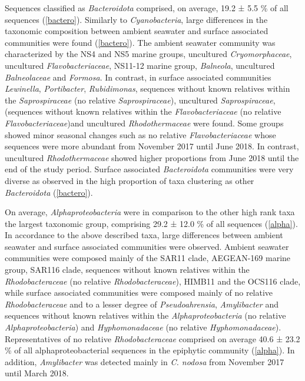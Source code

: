 \documentclass[12pt,]{article}
\begin{document}
Sequences classified as \emph{Bacteroidota} comprised, on average, 19.2
± 5.5 \si{\percent} of all sequences (\autoref{bactero}). Similarly to
\emph{Cyanobacteria}, large differences in the taxonomic composition
between ambient seawater and surface associated communities were found
(\autoref{bactero}). The ambient seawater community was characterized by
the NS4 and NS5 marine groups, uncultured \emph{Cryomorphaceae},
uncultured \emph{Flavobacteriaceae}, NS11-12 marine group,
\emph{Balneola}, uncultured \emph{Balneolaceae} and \emph{Formosa}. In
contrast, in surface associated communities \emph{Lewinella},
\emph{Portibacter}, \emph{Rubidimonas}, sequences without known
relatives within the \emph{Saprospiraceae} (no relative
\emph{Saprospiraceae}), uncultured \emph{Saprospiraceae}, (sequences
without known relatives within the \emph{Flavobacteriaceae} (no relative
\emph{Flavobacteriaceae})and uncultured \emph{Rhodothermaceae} were
found. Some groups showed minor seasonal changes such as no relative
\emph{Flavobacteriaceae} whose sequences were more abundant from
November 2017 until June 2018. In contrast, uncultured
\emph{Rhodothermaceae} showed higher proportions from June 2018 until
the end of the study period. Surface associated \emph{Bacteroidota}
communities were very diverse as observed in the high proportion of taxa
clustering as other \emph{Bacteroidota} (\autoref{bactero}).

On average, \emph{Alphaproteobacteria} were in comparison to the other
high rank taxa the largest taxonomic group, comprising 29.2 ± 12.0
\si{\percent} of all sequences (\autoref{alpha}). In accordance to the
above described taxa, large differences between ambient seawater and
surface associated communities were observed. Ambient seawater
communities were composed mainly of the SAR11 clade, AEGEAN-169 marine
group, SAR116 clade, sequences without known relatives within the
\emph{Rhodobacteraceae} (no relative \emph{Rhodobacteraceae}), HIMB11
and the OCS116 clade, while surface associated communities were composed
mainly of no relative \emph{Rhodobacteraceae} and to a lesser degree of
\emph{Pseudoahrensia}, \emph{Amylibacter} and sequences without known
relatives within the \emph{Alphaproteobacteria} (no relative
\emph{Alphaproteobacteria}) and \emph{Hyphomonadaceae} (no relative
\emph{Hyphomonadaceae}). Representatives of no relative
\emph{Rhodobacteraceae} comprised on average 40.6 ± 23.2 \si{\percent}
of all alphaproteobacterial sequences in the epiphytic community
(\autoref{alpha}). In addition, \emph{Amylibacter} was detected mainly
in \emph{C. nodosa} from November 2017 until March 2018.
\end{document}
